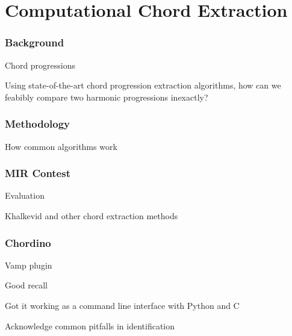 \chapter{Computational Chord Extraction} \label{computationchordextract}

\subsection{Background}

Chord progressions

\item Using state-of-the-art chord progression extraction algorithms, how can we feabibly compare two harmonic progressions inexactly?

\subsection{Methodology}

\item How common algorithms work

\subsection{MIR Contest}

\item Evaluation
\item Khalkevid and other chord extraction methods

\subsection{Chordino}

\item Vamp plugin
\item Good recall
\item Got it working as a command line interface with Python and C
\item Acknowledge common pitfalls in identification